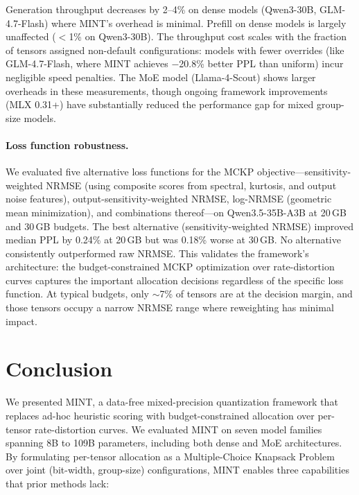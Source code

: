 \documentclass{article}
\begin{document}
Generation throughput decreases by 2--4\% on dense models (Qwen3-30B, GLM-4.7-Flash) where MINT's overhead is minimal. Prefill on dense models is largely unaffected ($<$1\% on Qwen3-30B). The throughput cost scales with the fraction of tensors assigned non-default configurations: models with fewer overrides (like GLM-4.7-Flash, where MINT achieves $-$20.8\% better PPL than uniform) incur negligible speed penalties. The MoE model (Llama-4-Scout) shows larger overheads in these measurements, though ongoing framework improvements (MLX 0.31+) have substantially reduced the performance gap for mixed group-size models.

\paragraph{Loss function robustness.}
We evaluated five alternative loss functions for the MCKP objective---sensitivity-weighted NRMSE (using composite scores from spectral, kurtosis, and output noise features), output-sensitivity-weighted NRMSE, log-NRMSE (geometric mean minimization), and combinations thereof---on Qwen3.5-35B-A3B at 20\,GB and 30\,GB budgets. The best alternative (sensitivity-weighted NRMSE) improved median PPL by 0.24\% at 20\,GB but was 0.18\% worse at 30\,GB. No alternative consistently outperformed raw NRMSE. This validates the framework's architecture: the budget-constrained MCKP optimization over rate-distortion curves captures the important allocation decisions regardless of the specific loss function. At typical budgets, only ${\sim}$7\% of tensors are at the decision margin, and those tensors occupy a narrow NRMSE range where reweighting has minimal impact.

\section{Conclusion}
\label{sec:conclusion}

We presented MINT, a data-free mixed-precision quantization framework that replaces ad-hoc heuristic scoring with budget-constrained allocation over per-tensor rate-distortion curves. We evaluated MINT on seven model families spanning 8B to 109B parameters, including both dense and MoE architectures. By formulating per-tensor allocation as a Multiple-Choice Knapsack Problem over joint (bit-width, group-size) configurations, MINT enables three capabilities that prior methods lack:
\end{document}
